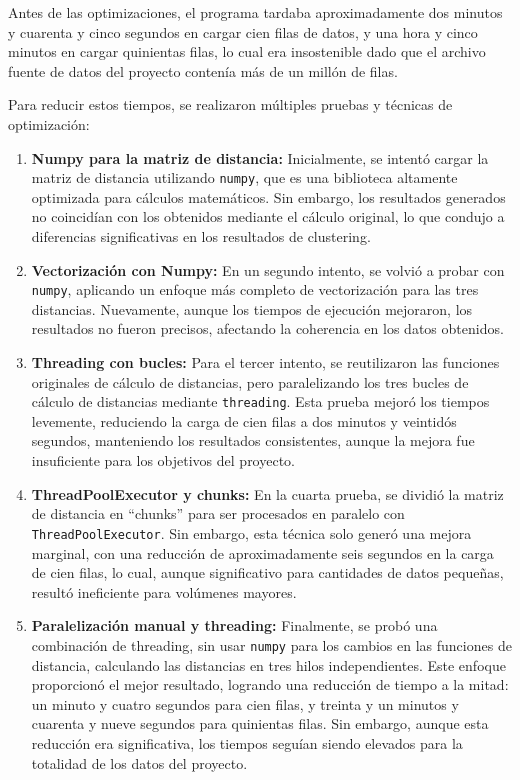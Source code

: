 Antes de las optimizaciones, el programa tardaba aproximadamente dos minutos y cuarenta y cinco segundos en cargar cien filas de datos, y una hora y cinco minutos en cargar quinientas filas, lo cual era insostenible dado que el archivo fuente de datos del proyecto contenía más de un millón de filas.

Para reducir estos tiempos, se realizaron múltiples pruebas y técnicas de optimización:

\begin{enumerate}
    \item \textbf{Numpy para la matriz de distancia:} Inicialmente, se intentó cargar la matriz de distancia utilizando \texttt{numpy}, que es una biblioteca altamente optimizada para cálculos matemáticos. Sin embargo, los resultados generados no coincidían con los obtenidos mediante el cálculo original, lo que condujo a diferencias significativas en los resultados de clustering.

    \item \textbf{Vectorización con Numpy:} En un segundo intento, se volvió a probar con \texttt{numpy}, aplicando un enfoque más completo de vectorización para las tres distancias. Nuevamente, aunque los tiempos de ejecución mejoraron, los resultados no fueron precisos, afectando la coherencia en los datos obtenidos.

    \item \textbf{Threading con bucles:} Para el tercer intento, se reutilizaron las funciones originales de cálculo de distancias, pero paralelizando los tres bucles de cálculo de distancias mediante \texttt{threading}. Esta prueba mejoró los tiempos levemente, reduciendo la carga de cien filas a dos minutos y veintidós segundos, manteniendo los resultados consistentes, aunque la mejora fue insuficiente para los objetivos del proyecto.

    \item \textbf{ThreadPoolExecutor y chunks:} En la cuarta prueba, se dividió la matriz de distancia en “chunks” para ser procesados en paralelo con \texttt{ThreadPoolExecutor}. Sin embargo, esta técnica solo generó una mejora marginal, con una reducción de aproximadamente seis segundos en la carga de cien filas, lo cual, aunque significativo para cantidades de datos pequeñas, resultó ineficiente para volúmenes mayores.

    \item \textbf{Paralelización manual y threading:} Finalmente, se probó una combinación de threading, sin usar \texttt{numpy} para los cambios en las funciones de distancia, calculando las distancias en tres hilos independientes. Este enfoque proporcionó el mejor resultado, logrando una reducción de tiempo a la mitad: un minuto y cuatro segundos para cien filas, y treinta y un minutos y cuarenta y nueve segundos para quinientas filas. Sin embargo, aunque esta reducción era significativa, los tiempos seguían siendo elevados para la totalidad de los datos del proyecto.
\end{enumerate}

